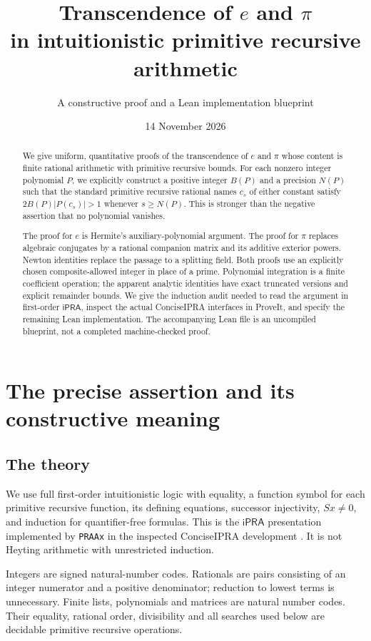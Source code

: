 \documentclass[11pt]{article}
\title{\color{navy}\bfseries Transcendence of \(e\) and \(\pi\)\\
in intuitionistic primitive recursive arithmetic}
\author{A constructive proof and a Lean implementation blueprint}
\date{14 November 2026}
\theoremstyle{definition}
\newcommand{\ipra}{\mathsf{iPRA}}
\begin{document}
\maketitle
\begin{abstract}
We give uniform, quantitative proofs of the transcendence of \(e\) and
\(\pi\) whose content is finite rational arithmetic with primitive recursive
bounds. For each nonzero integer polynomial \(P\), we explicitly construct a
positive integer \(B(P)\) and a precision \(N(P)\) such that the standard
primitive recursive rational names \(c_s\) of either constant satisfy
\(2B(P)|P(c_s)|>1\) whenever \(s\ge N(P)\).
This is stronger than the negative assertion that no polynomial vanishes.

The proof for \(e\) is Hermite's auxiliary-polynomial argument. The proof
for \(\pi\) replaces algebraic conjugates by a rational companion matrix and
its additive exterior powers. Newton identities replace the passage to a
splitting field. Both proofs use an explicitly chosen composite-allowed
integer in place of a prime. Polynomial integration is a finite coefficient
operation; the apparent analytic identities have exact truncated versions
and explicit remainder bounds. We give the induction audit needed to read
the argument in first-order \(\ipra\), inspect the actual ConciseIPRA
interfaces in ProveIt, and specify the remaining Lean implementation.
The accompanying Lean file is an uncompiled blueprint, not a completed
machine-checked proof.
\end{abstract}
\tableofcontents
\newpage

\section{The precise assertion and its constructive meaning}

\subsection{The theory}

We use full first-order intuitionistic logic with equality, a function
symbol for each primitive recursive function, its defining equations,
successor injectivity, \(Sx\ne0\), and induction for quantifier-free formulas.
This is the \(\ipra\) presentation implemented by
\texttt{PRAAx} in the inspected ConciseIPRA development
\cite{repoPR}. It is not Heyting arithmetic with unrestricted induction.

Integers are signed natural-number codes. Rationals are pairs consisting
of an integer numerator and a positive denominator; reduction to lowest
terms is unnecessary. Finite lists, polynomials and matrices are natural
number codes. Their equality, rational order, divisibility and all searches
used below are decidable primitive recursive operations.
\end{document}
